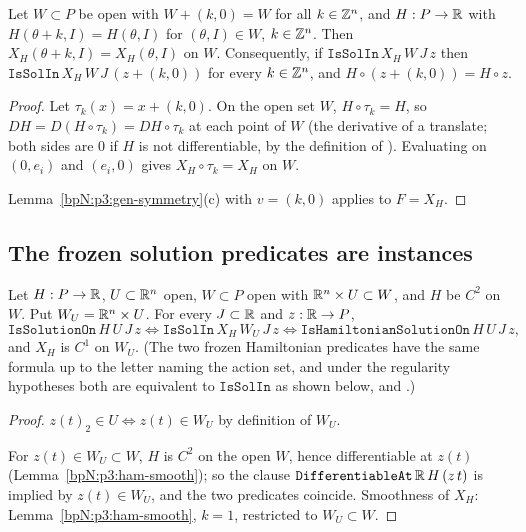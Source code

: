\begin{lemma}\label{bpN:p3:ham-periodic}
Let $W\subset P$ be open with $W+(k,0)=W$ for all $k\in\mathbb{Z}^n$, and $H:P\to\mathbb{R}$ with $H(\theta+k,I)=H(\theta,I)$ for $(\theta,I)\in W$,
$k\in\mathbb{Z}^n$. Then $X_H(\theta+k,I)=X_H(\theta,I)$ on $W$. Consequently, if $\texttt{IsSolIn}\,X_H\,W\,J\,z$ then
$\texttt{IsSolIn}\,X_H\,W\,J\,(z+(k,0))$ for every $k\in\mathbb{Z}^n$, and $H\circ(z+(k,0))=H\circ z$.
\end{lemma}
\begin{proof}
\label{stepN:p3:per-field} Let $\tau_k(x)=x+(k,0)$. On the open set $W$, $H\circ\tau_k=H$, so $DH=D(H\circ\tau_k)=DH\circ\tau_k$ at each point of $W$ (the derivative of a translate; both sides are $0$ if $H$ is not differentiable, by the definition of ). Evaluating on $(0,e_i)$ and $(e_i,0)$ gives $X_H\circ\tau_k=X_H$ on $W$.

\label{stepN:p3:per-sol} Lemma~\ref{bpN:p3:gen-symmetry}(c) with $v=(k,0)$ applies to $F=X_H$.
\end{proof}

\subsection{The frozen solution predicates are instances}\label{bpN:p3:s-frozen}

\begin{proposition}\label{bpN:p3:ham-reduction}
Let $H:P\to\mathbb{R}$, $U\subset\mathbb{R}^n$ open, $W\subset P$ open with $\mathbb{R}^n\times U\subset W$, and $H$ be $C^2$ on $W$. Put
$W_U=\mathbb{R}^n\times U$. For every $J\subset\mathbb{R}$ and $z:\mathbb{R}\to P$,
\[
\texttt{IsSolutionOn}\,H\,U\,J\,z\iff\texttt{IsSolIn}\,X_H\,W_U\,J\,z
\iff\texttt{IsHamiltonianSolutionOn}\,H\,U\,J\,z,
\]
and $X_H$ is $C^1$ on $W_U$. (The two frozen Hamiltonian predicates have the same formula up to the letter naming the action set, and under the regularity hypotheses both are equivalent to $\texttt{IsSolIn}$ as shown below,
 and .)
\end{proposition}
\begin{proof}
\label{stepN:p3:red-mem} $z(t)_2\in U\iff z(t)\in W_U$ by definition of $W_U$.

\label{stepN:p3:red-diff} For $z(t)\in W_U\subset W$, $H$ is $C^2$ on the open $W$, hence differentiable at $z(t)$ (Lemma~\ref{bpN:p3:ham-smooth}); so the clause $\texttt{DifferentiableAt}\,\mathbb{R}\,H\,(z\,t)$ is implied by $z(t)\in W_U$, and the two predicates coincide. Smoothness of $X_H$: Lemma~\ref{bpN:p3:ham-smooth}, $k=1$, restricted to $W_U\subset W$.
\end{proof}

